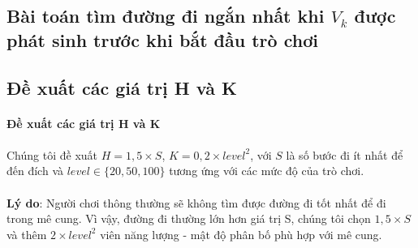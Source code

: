\subsection{Bài toán tìm đường đi ngắn nhất khi $V_k$ được phát sinh trước khi bắt đầu trò chơi}



\subsection{Đề xuất các giá trị H và K}

\paragraph{Đề xuất các giá trị H và K}
\paragraph{}{Chúng tôi đề xuất $H = 1,5 \times S$, $K = 0,2 \times level^{2}$, với $S$ là số bước đi ít nhất để đến đích và $level \in \{20, 50, 100\}$ tương ứng với các mức độ của trò chơi.}
\paragraph{}{\textbf{Lý do}: Người chơi thông thường sẽ không tìm được đường đi tốt nhất để đi trong mê cung. Vì vậy, đường đi thường lớn hơn giá trị S, chúng tôi chọn $1,5 \times S$ và thêm $2 
\times level^{2}$ viên năng lượng - mật độ phân bố phù hợp với mê cung.}